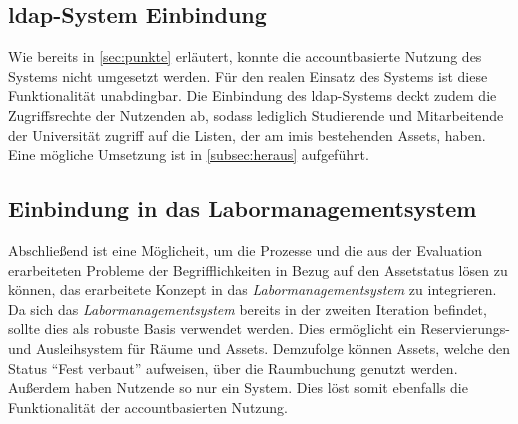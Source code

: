 \subsection{\ac{ldap}-System Einbindung}
Wie bereits in \ref{sec:punkte} erläutert, konnte die accountbasierte Nutzung des Systems nicht
umgesetzt werden. Für den realen Einsatz des Systems ist diese Funktionalität unabdingbar. Die
Einbindung des  \ac{ldap}-Systems deckt zudem die Zugriffsrechte der Nutzenden ab, sodass lediglich
Studierende und Mitarbeitende der Universität zugriff auf die Listen, der am \ac{imis} bestehenden Assets, haben. Eine
mögliche Umsetzung ist in \ref{subsec:heraus} aufgeführt.

\subsection{Einbindung in das Labormanagementsystem}
Abschließend ist eine Möglicheit, um die Prozesse und die aus der Evaluation erarbeiteten Probleme
der Begrifflichkeiten in Bezug auf den Assetstatus lösen zu können, das erarbeitete Konzept in das
\textit{Labormanagementsystem} \cite{Pabst2022} zu integrieren. Da sich das
\textit{Labormanagementsystem} bereits in der zweiten Iteration befindet, sollte dies als robuste
Basis verwendet werden. Dies ermöglicht ein Reservierungs- und Ausleihsystem für Räume und Assets.
Demzufolge können Assets, welche den Status \enquote{Fest verbaut} aufweisen, über die Raumbuchung
genutzt werden. Außerdem haben Nutzende so nur ein System. Dies löst somit ebenfalls die
Funktionalität der accountbasierten Nutzung.


